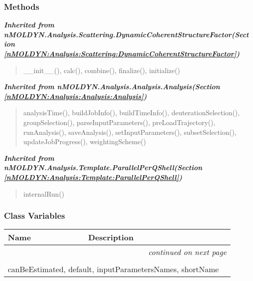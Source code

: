 
  \subsubsection{Methods}


\large{\textbf{\textit{Inherited from nMOLDYN.Analysis.Scattering.DynamicCoherentStructureFactor\textit{(Section \ref{nMOLDYN:Analysis:Scattering:DynamicCoherentStructureFactor})}}}}

\begin{quote}
\_\_init\_\_(), calc(), combine(), finalize(), initialize()
\end{quote}

\large{\textbf{\textit{Inherited from nMOLDYN.Analysis.Analysis.Analysis\textit{(Section \ref{nMOLDYN:Analysis:Analysis:Analysis})}}}}

\begin{quote}
analysisTime(), buildJobInfo(), buildTimeInfo(), deuterationSelection(), groupSelection(), parseInputParameters(), preLoadTrajectory(), runAnalysis(), saveAnalysis(), setInputParameters(), subsetSelection(), updateJobProgress(), weightingScheme()
\end{quote}

\large{\textbf{\textit{Inherited from nMOLDYN.Analysis.Template.ParallelPerQShell\textit{(Section \ref{nMOLDYN:Analysis:Template:ParallelPerQShell})}}}}

\begin{quote}
internalRun()
\end{quote}


  \subsubsection{Class Variables}

    \vspace{-1cm}
\hspace{\varindent}\begin{longtable}{|p{\varnamewidth}|p{\vardescrwidth}|l}
\cline{1-2}
\cline{1-2} \centering \textbf{Name} & \centering \textbf{Description}& \\
\cline{1-2}
\endhead\cline{1-2}\multicolumn{3}{r}{\small\textit{continued on next page}}\\\endfoot\cline{1-2}
\endlastfoot\multicolumn{2}{|l|}{\textit{Inherited from nMOLDYN.Analysis.Scattering.DynamicCoherentStructureFactor \textit{(Section \ref{nMOLDYN:Analysis:Scattering:DynamicCoherentStructureFactor})}}}\\
\multicolumn{2}{|p{\varwidth}|}{\raggedright canBeEstimated, default, inputParametersNames, shortName}\\
\cline{1-2}
\end{longtable}


